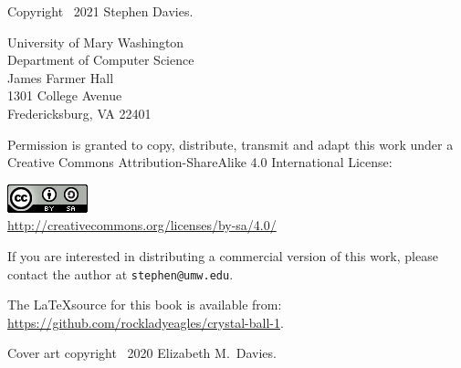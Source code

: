 
\thispagestyle{empty}

Copyright \textcopyright \ 2021 Stephen Davies.

\bigskip

University of Mary Washington\\
Department of Computer Science\\
James Farmer Hall\\
1301 College Avenue\\
Fredericksburg, VA  22401

\vspace{.4in}

Permission is granted to copy, distribute, transmit and adapt this work under a
Creative Commons Attribution-ShareAlike 4.0 International License:

\vspace{-.2in}
\begin{center}
\includegraphics{cc_license.png}\\
\smallskip
\url{http://creativecommons.org/licenses/by-sa/4.0/}
\end{center}

\vspace{.1in}
If you are interested in distributing a commercial version of this work, please
contact the author at \texttt{stephen@umw.edu}.

\vspace{1.6in}
The \LaTeX source for this book is available from:
\url{https://github.com/rockladyeagles/crystal-ball-1}.

\vspace{.4in}
Cover art copyright \textcopyright \ 2020 Elizabeth M.~Davies.
